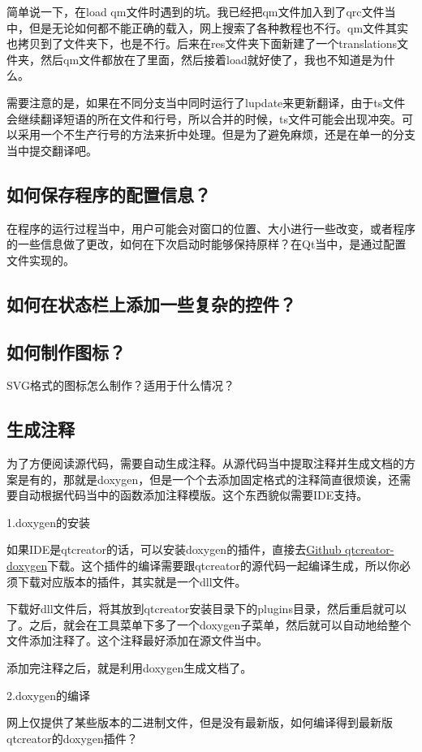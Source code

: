 简单说一下，在load qm文件时遇到的坑。我已经把qm文件加入到了qrc文件当中，但是无论如何都不能正确的载入，网上搜索了各种教程也不行。qm文件其实也拷贝到了文件夹下，也是不行。后来在res文件夹下面新建了一个translations文件夹，然后qm文件都放在了里面，然后接着load就好使了，我也不知道是为什么。

需要注意的是，如果在不同分支当中同时运行了lupdate来更新翻译，由于ts文件会继续翻译短语的所在文件和行号，所以合并的时候，ts文件可能会出现冲突。可以采用一个不生产行号的方法来折中处理。但是为了避免麻烦，还是在单一的分支当中提交翻译吧。
\subsection{如何保存程序的配置信息？}
在程序的运行过程当中，用户可能会对窗口的位置、大小进行一些改变，或者程序的一些信息做了更改，如何在下次启动时能够保持原样？在Qt当中，是通过配置文件实现的。
\subsection{如何在状态栏上添加一些复杂的控件？}
\subsection{如何制作图标？}
SVG格式的图标怎么制作？适用于什么情况？
\subsection{生成注释}
为了方便阅读源代码，需要自动生成注释。从源代码当中提取注释并生成文档的方案是有的，那就是doxygen，但是一个个去添加固定格式的注释简直很烦诶，还需要自动根据代码当中的函数添加注释模版。这个东西貌似需要IDE支持。

1.doxygen的安装

如果IDE是qtcreator的话，可以安装doxygen的插件，直接去\href{https://github.com/fpoussin/qtcreator-doxygen}{Github qtcreator-doxygen}下载。这个插件的编译需要跟qtcreator的源代码一起编译生成，所以你必须下载对应版本的插件，其实就是一个dll文件。

下载好dll文件后，将其放到qtcreator安装目录下的plugins目录，然后重启就可以了。之后，就会在工具菜单下多了一个doxygen子菜单，然后就可以自动地给整个文件添加注释了。这个注释最好添加在源文件当中。

添加完注释之后，就是利用doxygen生成文档了。

2.doxygen的编译

网上仅提供了某些版本的二进制文件，但是没有最新版，如何编译得到最新版qtcreator的doxygen插件？

